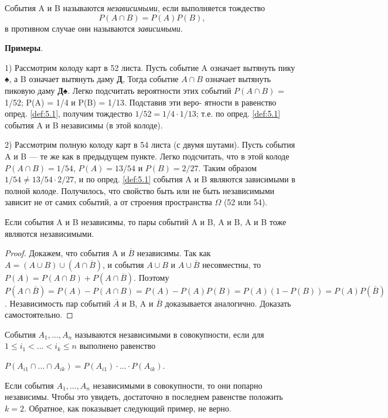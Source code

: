 
\begin{definition} 
\label{def:5.1}
События A и B называются \textit{независимыми}, если выполняется тождество
\begin{equation*}
	P(A \cap B) = P(A)P(B),
\end{equation*}
в противном случае они называются \textit{зависимыми}.
\end{definition}
	
	\textbf{Примеры}. 

	1) Рассмотрим колоду карт в 52 листа. Пусть событие A означает вытянуть пику ♠, а B означает вытянуть даму \textbf{Д}, Тогда событие $A\cap B$
означает вытянуть пиковую даму \textbf{Д♠}. Легко подсчитать вероятности этих
событий $P(A\cap B)$ = 1/52; P(A) = 1/4 и P(B) = 1/13. Подставив эти веро-
ятности в равенство опред. \ref{def:5.1}, получим тождество $1/52 = 1/4 \cdot1/13$; т.е. по
опред. \ref{def:5.1} события A и B независимы (в этой колоде).


2) Рассмотрим полную колоду карт в 54 листа (с двумя шутами). Пусть
события A и B — те же как в предыдущем пункте. Легко подсчитать, что в
этой колоде $P(A \cap B) = 1/54$, $P(A) = 13/54$ и $P(B) = 2/27$. Таким образом
$1/54 \neq 13/54 \cdot 2/27$, и по опред. \ref{def:5.1} события A и B являются зависимыми в
полной колоде.
Получилось, что свойство быть или не быть независимыми зависит не от
самих событий, а от строения пространства $\Omega$ (52 или 54).

\begin{lemma}
Если события A и B независимы, то пары событий A и B,
A и B, A и B тоже являются независимыми.
\end{lemma}
\begin{proof}
 Докажем, что события A и $\overline{B}$ независимы. Так как 
 $A =(A \cup B)\cup(A \cap \overline{B})$, и события $A\cup B$ и $A\cup \overline{B}$ несовместны, то  $P(A) = P(A\cap B)+P(A\cap\overline{B})$. 
Поэтому $P(A \cap  \overline{B}) = P(A) − P(A \cap  B) = P(A) − P(A)P(B) =
P(A)(1 − P(B)) = P(A)P(\overline{B})$.
Независимость пар событий $\overline{A}$ и B, A и $\overline{B}$ доказывается аналогично. Доказать самостоятельно.
\end{proof}

\begin{definition}
События $A_1,\dots,A_n$ называются независимыми в совокупности, если для $1 \leqslant i_1 < \dots < i_k \leqslant n$ выполнено равенство

$P(A_{i1}\cap \dots \cap  A_{ik}) = P(A_{i1}) \cdot\dots\cdot P(A_{ik})$.
\end{definition}
\begin{remark} 
Если события $A_1, \dots ,A_n$ независимыми в совокупности,
то они попарно независимы. Чтобы это увидеть, достаточно в последнем равенстве положить $k = 2$. Обратное, как показывает следующий пример, не
верно.
\end{remark}

